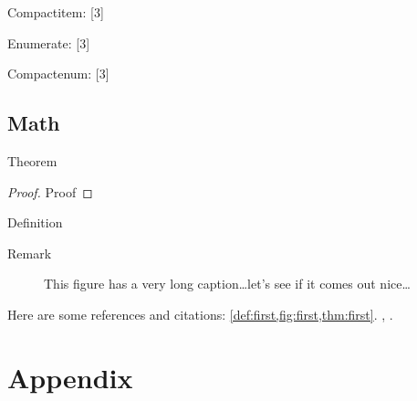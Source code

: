 \documentclass[phd,UKenglish,counters by chapter]{uniud}
\begin{document}
\blindtext[1]
Compactitem:
[3]

\blindtext[1]
Enumerate:
[3]

\blindtext[1]
Compactenum:
[3]
\blindtext[1]

\section{Math}

\begin{theorem}
	\label{thm:first}
	Theorem
\end{theorem}
\begin{proof}
	Proof
\end{proof}

\begin{definition}
	\label{def:first}
	Definition
\end{definition}

\begin{remark}
	\label{rem:first}
	Remark
\end{remark}

\begin{figure}[t]
\begin{center}
\end{center}
\caption{This figure has a very long caption\dots let's see if it comes out nice\dots}
\label{fig:first}
\end{figure}

Here are some references and citations: \cref{def:first,fig:first,thm:first}. , \cite{article,book,booklet,conference,inbook,incollection,manual,mastersthesis,misc,phdthesis,proceedings,techreport,unpublished}.


\blindmathpaper






\appendix

\chapter{Appendix}
\lipsum[1-7]
\end{document}
